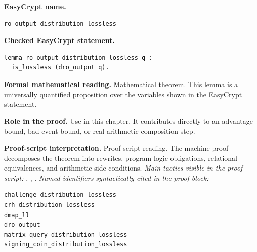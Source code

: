 \begin{formaltheorem}
\noindent\textbf{EasyCrypt name.}
\begin{lstlisting}[language=EasyCrypt,basicstyle=\ttfamily\scriptsize]
ro_output_distribution_lossless
\end{lstlisting}
\noindent\textbf{Checked EasyCrypt statement.}
\begin{lstlisting}[language=EasyCrypt,basicstyle=\ttfamily\scriptsize]
lemma ro_output_distribution_lossless q :
  is_lossless (dro_output q).
\end{lstlisting}
\noindent\textbf{Formal mathematical reading.}
Mathematical theorem. This lemma is a universally quantified proposition over the variables shown in the EasyCrypt statement.

\noindent\textbf{Role in the proof.}
Use in this chapter. It contributes directly to an advantage bound, bad-event bound, or real-arithmetic composition step.

\noindent\textbf{Proof-script interpretation.}
Proof-script reading. The machine proof decomposes the theorem into rewrites, program-logic obligations, relational equivalences, and arithmetic side conditions.
\emph{Main tactics visible in the proof script:} , , .
\emph{Named identifiers syntactically cited in the proof block:}
\begin{lstlisting}[language=EasyCrypt,basicstyle=\ttfamily\scriptsize]
challenge_distribution_lossless
crh_distribution_lossless
dmap_ll
dro_output
matrix_query_distribution_lossless
signing_coin_distribution_lossless
\end{lstlisting}

\end{formaltheorem}

